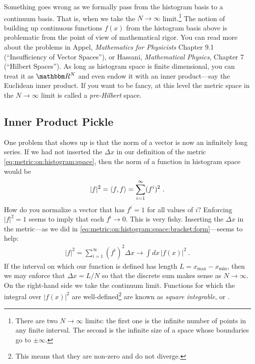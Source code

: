 Something goes wrong as we formally pass from the histogram basis to a continuum basis. That is, when we take the $N\to \infty$ limit.\footnote{There are two $N\to \infty$ limits: the first one is the infinite number of points in any finite interval. The second is the infinite size of a space whose boundaries go to $\pm\infty$. } The notion of building up continuous functions $f(x)$ from the histogram basis above is problematic from the point of view of mathematical rigor. You can read more about the problems in Appel, \emph{Mathematics for Physicists} Chapter 9.1 (``Insufficiency of Vector Spaces''), or Hassani, \emph{Mathematical Physics}, Chapter 7 (``Hilbert Spaces''). As long as histogram space is finite dimensional, you can treat it as $\RR^N$ and even endow it with an inner product---say the Euclidean inner product. If you want to be fancy, at this level the metric space in the $N\to\infty$ limit is called a \emph{pre-Hilbert} space. 


\subsection{Inner Product Pickle}

One problem that shows up is that the norm of a vector is now an infinitely long series. If we had not inserted the $\Delta x$ in our definition of the metric \eqref{eq:metric:on:histogram:space}, then the norm of a function in histogram space would be
\begin{align}
    |f|^2 = \langle f, f \rangle = \sum_{i=1}^\infty (f^i)^2 \ .
    \label{eq:norm:in:function:space:no:dx}
\end{align}
How do you normalize a vector that has $f^i = 1$ for all values of $i$? Enforcing $|f|^2 = 1$ seems to imply that each $f^i \to 0$. This is very fishy.  Inserting the $\Delta x$ in the metric---as we did in \eqref{eq:metric:on:histogram:space:bracket:form}---seems to help:
\begin{align}
    |f|^2 = \sum_{i=1}^\infty (f^i)^2 \Delta x \to \int dx\, |f(x)|^2 \ .
    \label{eq:norm:in:function:space}
\end{align}
If the interval on which our function is defined has length $L = x_\text{max}- x_\text{min}$, then we may enforce that $\Delta x = L/N$ so that the discrete sum makes sense as $N\to\infty$. On the right-hand side we take the continuum limit. Functions for which the integral over $|f(x)|^2$ are well-defined\footnote{This means that they are non-zero and do not diverge.} are known as \emph{square integrable}, or . 

